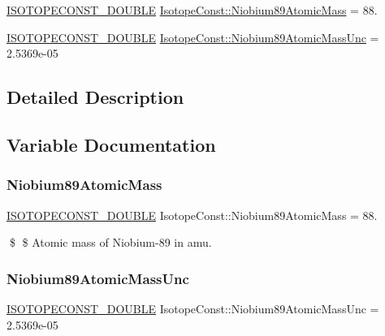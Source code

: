\begin{DoxyCompactItemize}
\item 
\mbox{\hyperlink{group___isotope_const-_macros_ga8f45a7272ce02c0b4c65c44636ed719a}{I\+S\+O\+T\+O\+P\+E\+C\+O\+N\+S\+T\+\_\+\+D\+O\+U\+B\+LE}} \mbox{\hyperlink{group___isotope_const-_niobium-_nb89_ga4ce457a2a3d6f0377a5d556ea16dbb49}{Isotope\+Const\+::\+Niobium89\+Atomic\+Mass}} = 88.
\item 
\mbox{\hyperlink{group___isotope_const-_macros_ga8f45a7272ce02c0b4c65c44636ed719a}{I\+S\+O\+T\+O\+P\+E\+C\+O\+N\+S\+T\+\_\+\+D\+O\+U\+B\+LE}} \mbox{\hyperlink{group___isotope_const-_niobium-_nb89_gae8708a7a3b354b335cdcfd43a3e52c5c}{Isotope\+Const\+::\+Niobium89\+Atomic\+Mass\+Unc}} = 2.\+5369e-\/05
\end{DoxyCompactItemize}


\subsection{Detailed Description}


\subsection{Variable Documentation}
\mbox{\label{group___isotope_const-_niobium-_nb89_ga4ce457a2a3d6f0377a5d556ea16dbb49}} 
\subsubsection{\texorpdfstring{Niobium89\+Atomic\+Mass}{Niobium89AtomicMass}}
{\footnotesize\ttfamily \mbox{\hyperlink{group___isotope_const-_macros_ga8f45a7272ce02c0b4c65c44636ed719a}{I\+S\+O\+T\+O\+P\+E\+C\+O\+N\+S\+T\+\_\+\+D\+O\+U\+B\+LE}} Isotope\+Const\+::\+Niobium89\+Atomic\+Mass = 88.}

\$ \$ Atomic mass of Niobium-\/89 in amu. \mbox{\label{group___isotope_const-_niobium-_nb89_gae8708a7a3b354b335cdcfd43a3e52c5c}} 
\subsubsection{\texorpdfstring{Niobium89\+Atomic\+Mass\+Unc}{Niobium89AtomicMassUnc}}
{\footnotesize\ttfamily \mbox{\hyperlink{group___isotope_const-_macros_ga8f45a7272ce02c0b4c65c44636ed719a}{I\+S\+O\+T\+O\+P\+E\+C\+O\+N\+S\+T\+\_\+\+D\+O\+U\+B\+LE}} Isotope\+Const\+::\+Niobium89\+Atomic\+Mass\+Unc = 2.\+5369e-\/05}

